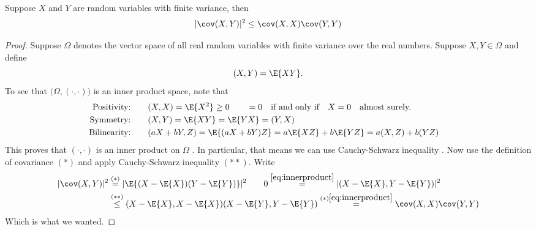 \documentclass[11pt,english,a4paper]{article}
\begin{document}
\begin{lemma*}
Suppose $X$ and $Y$ are random variables with finite variance, then
\[
| \cov (X,Y) |^2 \leq \cov (X,X) \cov (Y,Y)
\]
\label{lemma:inequality}
\end{lemma*}
\begin{proof}
Suppose $\Omega$ denotes the vector space of all real random variables with finite variance over the real numbers. Suppose $X,Y \in \Omega$ and define
\begin{equation}
(X,Y) = \E{X Y}. \label{eq:innerproduct}
\end{equation}
To see that $\big( \Omega, (\cdot,\cdot) \big)$ is an inner product space, note that
\begin{align*}
\text{Positivity:} \qquad &(X,X) = \E{X^2} \geq 0 \qquad =0 \quad \text{if and only if} \quad X=0 \quad \text{almost surely.}\\ 
\text{Symmetry:} \qquad &(X,Y) = \E{XY} = \E{YX} = (Y,X)\\ 
\text{Bilinearity:} \qquad &(aX + bY,Z) = \E{(aX + bY)Z} = a\E{XZ} + b\E{YZ} = a(X,Z) + b(YZ) &
\end{align*}
This proves that $( \cdot, \cdot )$ is an inner product on $\Omega$ \parencite{mcdonald_course_2012}. In particular, that means we can use Cauchy-Schwarz inequality \parencite{lay_linear_2012}. Now use the definition of covariance $(*)$ and apply Cauchy-Schwarz inequality $(**)$. Write
\begin{align*}
| \cov (X,Y) |^2 &\stackrel{(*)}{=} | \E{(X - \E{X})(Y - \E{Y})} |^2\qquad 0  \stackrel{\eqref{eq:innerproduct}}{=} | (X-\E{X}, Y-\E{Y}) |^2 \\
&\stackrel{(**)}{\leq}  (X-\E{X}, X-\E{X})(X-\E{Y}, Y-\E{Y}) \stackrel{(*)\eqref{eq:innerproduct}}{=} \cov (X,X) \cov (Y,Y)
\end{align*}
Which is what we wanted.
\end{proof}
\printbibliography
\end{document}
